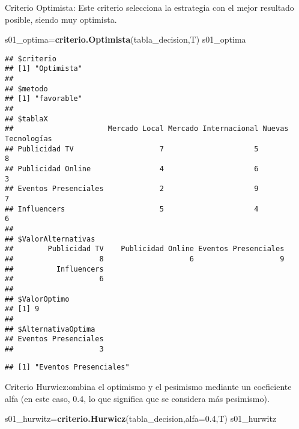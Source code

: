 \documentclass[
]{article}
\newenvironment{Shaded}{\begin{snugshade}}{\end{snugshade}}
\newcommand{\AttributeTok}[1]{\textcolor[rgb]{0.13,0.29,0.53}{#1}}
\newcommand{\FloatTok}[1]{\textcolor[rgb]{0.00,0.00,0.81}{#1}}
\newcommand{\FunctionTok}[1]{\textcolor[rgb]{0.13,0.29,0.53}{\textbf{#1}}}
\newcommand{\NormalTok}[1]{#1}
\newcommand{\OtherTok}[1]{\textcolor[rgb]{0.56,0.35,0.01}{#1}}
\newcommand{\SpecialCharTok}[1]{\textcolor[rgb]{0.81,0.36,0.00}{\textbf{#1}}}
\begin{document}
Criterio Optimista: Este criterio selecciona la estrategia con el mejor
resultado posible, siendo muy optimista.

\begin{Shaded}
\begin{Highlighting}[]
\NormalTok{s01\_optima}\OtherTok{=}\FunctionTok{criterio.Optimista}\NormalTok{(tabla\_decision,T)}
\NormalTok{s01\_optima}
\end{Highlighting}
\end{Shaded}

\begin{verbatim}
## $criterio
## [1] "Optimista"
## 
## $metodo
## [1] "favorable"
## 
## $tablaX
##                      Mercado Local Mercado Internacional Nuevas Tecnologías
## Publicidad TV                    7                     5                  8
## Publicidad Online                4                     6                  3
## Eventos Presenciales             2                     9                  7
## Influencers                      5                     4                  6
## 
## $ValorAlternativas
##        Publicidad TV    Publicidad Online Eventos Presenciales 
##                    8                    6                    9 
##          Influencers 
##                    6 
## 
## $ValorOptimo
## [1] 9
## 
## $AlternativaOptima
## Eventos Presenciales 
##                    3
\end{verbatim}

\begin{Shaded}
\end{Shaded}

\begin{verbatim}
## [1] "Eventos Presenciales"
\end{verbatim}

Criterio Hurwicz:ombina el optimismo y el pesimismo mediante un
coeficiente alfa (en este caso, 0.4, lo que significa que se considera
más pesimismo).

\begin{Shaded}
\begin{Highlighting}[]
\NormalTok{s01\_hurwitz}\OtherTok{=}\FunctionTok{criterio.Hurwicz}\NormalTok{(tabla\_decision,}\AttributeTok{alfa=}\FloatTok{0.4}\NormalTok{,T)}
\NormalTok{s01\_hurwitz}
\end{Highlighting}
\end{Shaded}
\end{document}
